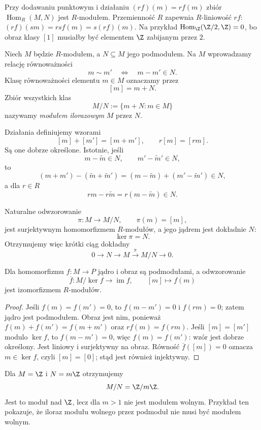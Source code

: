 Przy dodawaniu punktowym i działaniu $(rf)(m)=r f(m)$
zbiór $\operatorname{Hom}_R(M,N)$ jest $R$-modułem.
Przemienność $R$ zapewnia $R$-liniowość $rf$:
$(rf)(sm)=rsf(m)=s(rf)(m)$.
Na przykład $\operatorname{Hom}_{\Z}(\Z/2,\Z)=0$,
bo obraz klasy $[1]$ musiałby być elementem $\Z$ zabijanym przez $2$.

\begin{definicja}
\label{def:modul-ilorazowy}
Niech $M$ będzie $R$-modułem, a $N\subseteq M$ jego podmodułem.
Na $M$ wprowadzamy relację równoważności
\[
m\sim m'
\quad\Longleftrightarrow\quad
m-m'\in N.
\]
Klasę równoważności elementu $m\in M$ oznaczamy przez
\[
[m]=m+N.
\]
Zbiór wszystkich klas
\[
M/N:=\{m+N:m\in M\}
\]
nazywamy \emph{modułem ilorazowym} $M$ przez $N$.

Działania definiujemy wzorami
\[
[m]+[m']=[m+m'],
\qquad
r[m]=[rm].
\]
Są one dobrze określone. Istotnie, jeśli
\[
m-\widetilde m\in N,
\qquad
m'-\widetilde m'\in N,
\]
to
\[
(m+m')-(\widetilde m+\widetilde m')
=
(m-\widetilde m)+(m'-\widetilde m')
\in N,
\]
a dla $r\in R$
\[
rm-r\widetilde m
=
r(m-\widetilde m)
\in N.
\]
\end{definicja}

Naturalne odwzorowanie
\[
\pi\colon M\to M/N,
\qquad
\pi(m)=[m],
\]
jest surjektywnym homomorfizmem $R$-modułów, a jego jądrem jest
dokładnie $N$:
\[
\ker\pi=N.
\]
Otrzymujemy więc krótki ciąg dokładny
\[
0\longrightarrow N
\longrightarrow M
\overset{\pi}{\longrightarrow}M/N
\longrightarrow0.
\]

\begin{twierdzenie}
\label{thm:modul-izomorfizm}
Dla homomorfizmu $f:M\to P$ jądro i obraz są podmodułami,
a odwzorowanie
\[
\overline f:M/\ker f\longrightarrow\operatorname{im}f,
\qquad [m]\longmapsto f(m)
\]
jest izomorfizmem $R$-modułów.
\end{twierdzenie}
\begin{proof}
Jeśli $f(m)=f(m')=0$, to $f(m-m')=0$ i $f(rm)=0$;
zatem jądro jest podmodułem. Obraz jest nim, ponieważ
$f(m)+f(m')=f(m+m')$ oraz $rf(m)=f(rm)$.
Jeśli $[m]=[m']$ modulo $\ker f$, to $f(m-m')=0$,
więc $f(m)=f(m')$: wzór jest dobrze określony.
Jest liniowy i surjektywny na obraz. Równość
$\overline f([m])=0$ oznacza $m\in\ker f$, czyli $[m]=[0]$;
stąd jest również injektywny.
\end{proof}

\begin{przyklad}
Dla $M=\Z$ i $N=m\Z$ otrzymujemy
\[
M/N=\Z/m\Z.
\]
Jest to moduł nad $\Z$, lecz dla $m>1$ nie jest modułem wolnym.
Przykład ten pokazuje, że iloraz modułu wolnego przez podmoduł
nie musi być modułem wolnym.
\end{przyklad}

